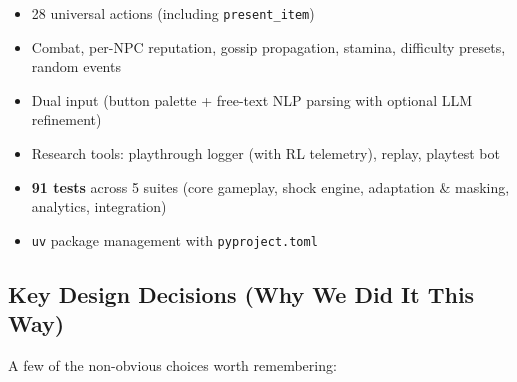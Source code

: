 \begin{itemize}
    \item 28 universal actions (including \texttt{present\_item})
    \item Combat, per-NPC reputation, gossip propagation, stamina, difficulty presets, random events
    \item Dual input (button palette + free-text NLP parsing with optional LLM refinement)
    \item Research tools: playthrough logger (with RL telemetry), replay, playtest bot
    \item \textbf{91 tests} across 5 suites (core gameplay, shock engine, adaptation \& masking, analytics, integration)
    \item \texttt{uv} package management with \texttt{pyproject.toml}
\end{itemize}

\subsection{Key Design Decisions (Why We Did It This Way)}

A few of the non-obvious choices worth remembering:

